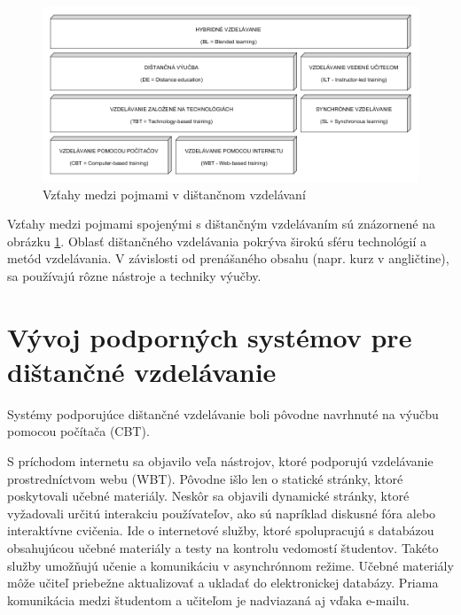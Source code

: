 \documentclass[10pt,oneside,slovak,a4paper]{article}
\begin{document}
\begin{figure}[h]
	\centering
	\includegraphics[width=\textwidth]{Vztahy_DE.png}
	\caption{Vzťahy medzi pojmami v dištančnom vzdelávaní\cite{WiktorzakKotowski}}
	\label{Vztahy_medzi_pojmami}
\end{figure}

Vzťahy medzi pojmami spojenými s dištančným vzdelávaním sú znázornené na obrázku \ref{Vztahy_medzi_pojmami}.%
Oblasť dištančného vzdelávania pokrýva širokú sféru technológií a metód vzdelávania. %
V závislosti od prenášaného obsahu (napr. kurz v angličtine), sa používajú rôzne nástroje a techniky výučby.

\section{Vývoj podporných systémov pre dištančné vzdelávanie}%
\label{Vyvojsys}
Systémy podporujúce dištančné vzdelávanie boli pôvodne navrhnuté na výučbu pomocou počítača (CBT)\cite{WiktorzakKotowski}.%

S príchodom internetu sa objavilo veľa nástrojov, ktoré podporujú vzdelávanie prostredníctvom webu (WBT).
Pôvodne išlo len o statické stránky, ktoré poskytovali učebné materiály.
Neskôr sa objavili dynamické stránky, ktoré vyžadovali určitú interakciu používateľov, ako sú napríklad diskusné fóra alebo interaktívne cvičenia.
Ide o internetové služby, ktoré spolupracujú s databázou obsahujúcou učebné materiály a testy na kontrolu vedomostí študentov. %
Takéto služby umožňujú učenie a komunikáciu v asynchrónnom režime. Učebné materiály môže učiteľ priebežne aktualizovať a ukladať do elektronickej databázy.
Priama komunikácia medzi študentom a učiteľom je nadviazaná aj vďaka e-mailu.
\end{document}
